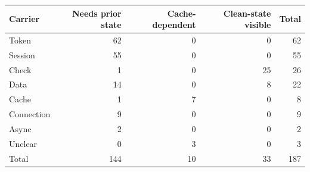 \begin{tabular}{lrrrr}
\toprule
Carrier & Needs prior state & Cache-dependent & Clean-state visible & Total \\
\midrule
Token & 62 & 0 & 0 & 62 \\
Session & 55 & 0 & 0 & 55 \\
Check & 1 & 0 & 25 & 26 \\
Data & 14 & 0 & 8 & 22 \\
Cache & 1 & 7 & 0 & 8 \\
Connection & 9 & 0 & 0 & 9 \\
Async & 2 & 0 & 0 & 2 \\
Unclear & 0 & 3 & 0 & 3 \\
\midrule
Total & 144 & 10 & 33 & 187 \\
\bottomrule
\end{tabular}
